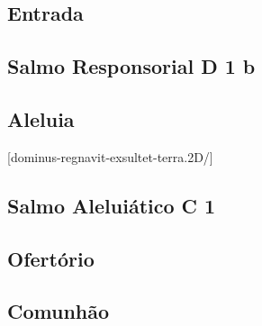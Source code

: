 
\subsection{Entrada}\label{subsection:proprium-sanctorum/in-exaltatione-sanctae-crucis/introitus}

\AllowPageFlush

\subsection[Salmo Responsorial]{Salmo Responsorial \textmd{D 1 b}}\label{subsection:proprium-sanctorum/in-exaltatione-sanctae-crucis/psalmus-responsorius}

\AllowPageFlush

\subsection{Aleluia}\label{subsection:proprium-sanctorum/in-exaltatione-sanctae-crucis/alleluia}
[dominus-regnavit-exsultet-terra.2D/]

\AllowPageFlush

\subsection[Salmo Aleluiático]{Salmo Aleluiático \textmd{C 1}}\label{subsection:proprium-sanctorum/in-exaltatione-sanctae-crucis/psalmus-alleluiaticus}

\AllowPageFlush

\subsection{Ofertório}\label{subsection:proprium-sanctorum/in-exaltatione-sanctae-crucis/offertorium}

\AllowPageFlush

\subsection{Comunhão}\label{subsection:proprium-sanctorum/in-exaltatione-sanctae-crucis/communio}
